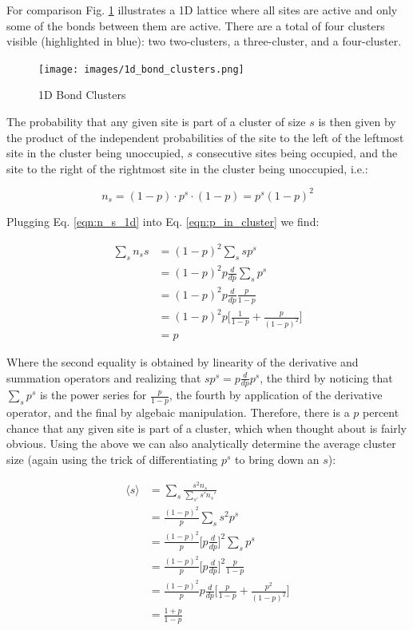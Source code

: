 For comparison Fig. \ref{fig:1d_bond_clusters} illustrates a 1D lattice where all sites are active and only some of the bonds between them are active.
There are a total of four clusters visible (highlighted in blue): two two-clusters, a three-cluster, and a four-cluster.

\begin{figure}[H]
	\centering
	\texttt{[image: images/1d\_bond\_clusters.png]}
	\caption{1D Bond Clusters}
	\label{fig:1d_bond_clusters}
\end{figure}

The probability that any given site is part of a cluster of size $s$ is then given by the product of the independent probabilities of the site to the left of the leftmost site in the cluster being unoccupied, $s$ consecutive sites being occupied, and the site to the right of the rightmost site in the cluster being unoccupied, i.e.:

\begin{equation}
	\label{eqn:n_s_1d}
	n_s = (1 - p) \cdot p^s \cdot (1 - p) = p^s (1 - p)^2
\end{equation}

Plugging Eq. \ref{eqn:n_s_1d} into Eq. \ref{eqn:p_in_cluster} we find:

\begin{equation}
\begin{split}
	\sum_s n_s s &= (1 - p)^2 \sum_s s p^s\\
	&= (1 - p)^2 p \frac{d}{dp} \sum_s p^s\\
	&= (1 - p)^2 p \frac{d}{dp} \frac{p}{1-p}\\
	&= (1 - p)^2 p \bigg[ \frac{1}{1-p} + \frac{p}{(1 - p)^2} \bigg]\\
	&= p
\end{split}
\end{equation}

Where the second equality is obtained by linearity of the derivative and summation operators and realizing that $s p^s = p \frac{d}{dp} p^s$, the third by noticing that $\sum_s p^s$ is the power series for $\frac{p}{1-p}$, the fourth by application of the derivative operator, and the final by algebaic manipulation.
Therefore, there is a $p$ percent chance that any given site is part of a cluster, which when thought about is fairly obvious.
Using the above we can also analytically determine the average cluster size (again using the trick of differentiating $p^s$ to bring down an $s$):

\begin{equation}
\begin{split}
	\langle s \rangle &= \sum_s \frac{s^2 n_s}{\sum_{s'} s' n_s'}\\
	&= \frac{(1 - p)^2}{p} \sum_s s^2 p^s\\
	&= \frac{(1 - p)^2}{p} \bigg[p\frac{d}{dp}\bigg]^2 \sum_s p^s\\
	&= \frac{(1 - p)^2}{p} \bigg[p\frac{d}{dp}\bigg]^2 \frac{p}{1 - p}\\
	&= \frac{(1 - p)^2}{p} p \frac{d}{dp} \bigg[ \frac{p}{1-p} + \frac{p^2}{(1 - p)^2} \bigg]\\
	&= \frac{1 + p}{1 - p}
\end{split}
\end{equation}

